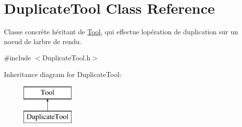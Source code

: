 \hypertarget{class_duplicate_tool}{}\section{Duplicate\+Tool Class Reference}
\label{class_duplicate_tool}


Classe concrète héritant de \hyperlink{class_tool}{Tool}, qui effectue l\textquotesingle{}opération de duplication sur un noeud de l\textquotesingle{}arbre de rendu.  




{\ttfamily \#include $<$Duplicate\+Tool.\+h$>$}

Inheritance diagram for Duplicate\+Tool\+:\begin{figure}[H]
\begin{center}
\leavevmode
\includegraphics[height=2.000000cm]{class_duplicate_tool}
\end{center}
\end{figure}
